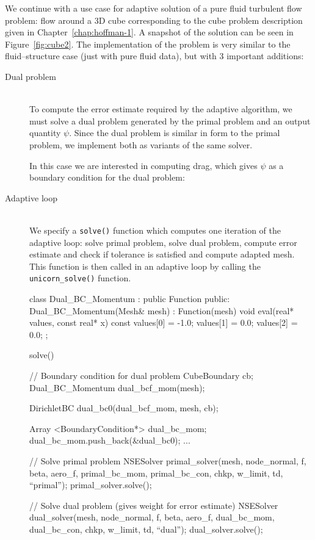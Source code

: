 We continue with a use case for adaptive solution of a pure fluid
turbulent flow problem: flow around a 3D cube corresponding to the
cube problem description given in Chapter~\ref{chap:hoffman-1}. A
snapshot of the solution can be seen in
Figure~\ref{fig:cube2}. The implementation of the problem is
very similar to the fluid--structure case (just with pure fluid data),
but with 3 important additions:
\begin{description}
\item[Dual problem] \ \\ To compute the error estimate required by the
  adaptive algorithm, we must solve a dual problem generated by the
  primal problem and an output quantity $\psi$. Since the dual problem
  is similar in form to the primal problem, we implement both as
  variants of the same solver.

In this case we are interested in computing drag, which gives $\psi$
as a boundary condition for the dual problem:

\item[Adaptive loop] \ \\ We specify a {\tt solve()} function which computes one
  iteration of the adaptive loop: solve primal problem, solve dual
  problem, compute error estimate and check if tolerance is satisfied
  and compute adapted mesh. This function is then called in an
  adaptive loop by calling the {\tt unicorn\_solve()} function.

\begin{c++}
class Dual_BC_Momentum : public Function
{
public:
  Dual_BC_Momentum(Mesh& mesh) : Function(mesh) {}
  void eval(real* values, const real* x) const
  {
    values[0] = -1.0;
    values[1] = 0.0;
    values[2] = 0.0;
  }
};


solve()
{
  // Boundary condition for dual problem
  CubeBoundary cb;
  Dual_BC_Momentum dual_bcf_mom(mesh);

  DirichletBC dual_bc0(dual_bcf_mom, mesh, cb);

  Array <BoundaryCondition*> dual_bc_mom;
  dual_bc_mom.push_back(&dual_bc0);
  ...


  // Solve primal problem
  NSESolver primal_solver(mesh, node_normal, f, beta, aero_f, primal_bc_mom, primal_bc_con,
    chkp, w_limit, td, ``primal'');
  primal_solver.solve();

  // Solve dual problem (gives weight for error estimate)
  NSESolver dual_solver(mesh, node_normal, f, beta, aero_f, dual_bc_mom, dual_bc_con,
    chkp, w_limit, td, ``dual'');
  dual_solver.solve();
}


\end{c++}
\end{description}
